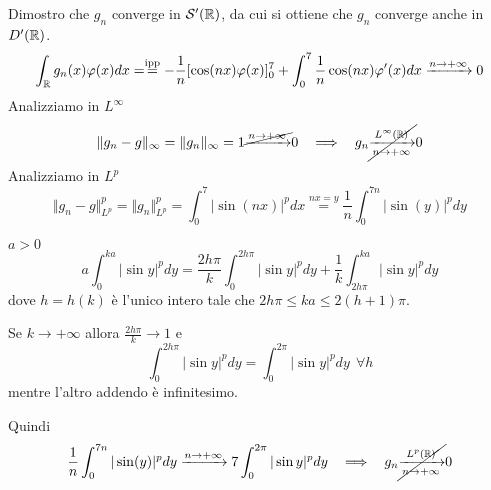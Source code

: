Dimostro che $g_{n}$ converge in $\mathcal{S}  '(\mathbb{R} )$, da cui si ottiene che $g_{n}$ converge anche in $D'(\mathbb{R} )$.
\begin{equation*}
\int _{\mathbb{R} } g_{n}( x) \varphi ( x) dx=\overset{\text{ipp}}{=} -\frac{1}{n}[\cos( nx) \varphi ( x)]^{7}_{0} +\int ^{7}_{0}\frac{1}{n}\cos( nx) \varphi '( x) dx\xrightarrow{n\rightarrow +\infty } 0
\end{equation*}
Analizziamo in $L^{\infty }$
\begin{equation*}
\Vert g_{n} -g\Vert _{\infty } =\Vert g_{n}\Vert _{\infty } =1\cancel{\xrightarrow{n\rightarrow +\infty }} 0\ \ \implies \ \ g_{n}\cancel{\xrightarrow[n\rightarrow +\infty ]{L^{\infty }(\RR )}} 0
\end{equation*}
Analizziamo in $L^{p}$
\begin{equation*}
\Vert g_{n} -g\Vert ^{p}_{L^{p}} =\Vert g_{n}\Vert ^{p}_{L^{p}} =\int ^{7}_{0}| \sin( nx)| ^{p} dx\overset{nx=y}{=}\frac{1}{n}\int ^{7n}_{0}| \sin( y)| ^{p} dy
\end{equation*}
\begin{rem}
$a >0$
\begin{equation*}
a\int ^{ka}_{0}| \sin y| ^{p} dy=\frac{2h\pi }{k}\int ^{2h\pi }_{0}| \sin y| ^{p} dy+\frac{1}{k}\int ^{ka}_{2h\pi }| \sin y| ^{p} dy
\end{equation*}
dove $h=h( k)$ è l'unico intero tale che $2h\pi \leqslant ka\leqslant 2( h+1) \pi $.

Se $k\rightarrow +\infty $ allora $\frac{2h\pi }{k}\rightarrow 1$ e
\begin{equation*}
\int ^{2h\pi }_{0}| \sin y| ^{p} dy=\int ^{2\pi }_{0}| \sin y| ^{p} dy\ \ \forall h
\end{equation*}
mentre l'altro addendo è infinitesimo.
\end{rem}
Quindi
\begin{equation*}
\frac{1}{n}\int ^{7n}_{0}| \sin( y)| ^{p} dy\xrightarrow{n\rightarrow +\infty } 7\int ^{2\pi }_{0}| \sin y| ^{p} dy\ \ \implies \ \ g_{n}\cancel{\xrightarrow[n\rightarrow +\infty ]{L^{p}(\mathbb{R} )}} 0
\end{equation*}
\Soluzione
